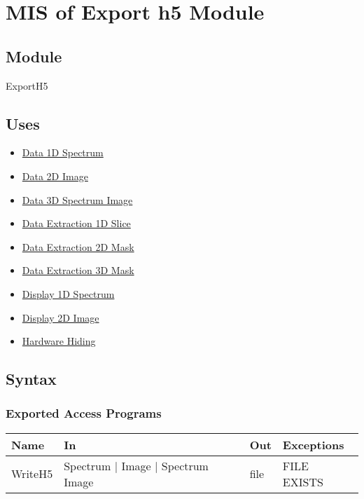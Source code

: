 \documentclass[12pt, titlepage]{article}
\begin{document}
\section{MIS of Export h5 Module} \label{Mod:ExportH5}

\subsection{Module}

ExportH5

\subsection{Uses}
\begin{itemize}
    \item \hyperref[Mod:Spectrum]{Data 1D Spectrum}
    \item \hyperref[Mod:Image]{Data 2D Image}
    \item \hyperref[Mod:SI]{Data 3D Spectrum Image}
    \item \hyperref[Mod:Slice1D]{Data Extraction 1D Slice}
    \item \hyperref[Mod:Mask2D]{Data Extraction 2D Mask}
    \item \hyperref[Mod:Mask3D]{Data Extraction 3D Mask}
    \item \hyperref[Mod:Disp1D]{Display 1D Spectrum}
    \item \hyperref[Mod:Disp2D]{Display 2D Image}
    \item \hyperref[Mod:HH]{Hardware Hiding}
\end{itemize}

\subsection{Syntax}

\subsubsection{Exported Access Programs}

\begin{center}
    \begin{tabular}{p{2cm} p{4cm} p{2cm} p{4cm}}
        \hline
        \textbf{Name} & \textbf{In} & \textbf{Out} & \textbf{Exceptions} \\
        \hline
        WriteH5 & Spectrum $|$ Image $|$ Spectrum Image & file & FILE EXISTS \\
        \hline
    \end{tabular}
\end{center}
\end{document}
